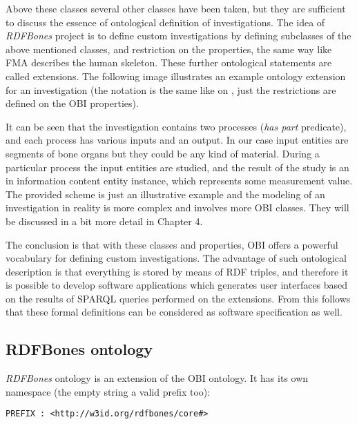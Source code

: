 Above these classes several other classes have been taken, but they are sufficient to discuss the essence of ontological definition of investigations. The idea of \textit{RDFBones} project is to define custom investigations by defining subclasses of the above mentioned classes, and restriction on the properties, the same way like FMA describes the human skeleton. These further ontological statements are called extensions. The following image illustrates an example ontology extension for an investigation (the notation is the same like on , just the restrictions are defined on the OBI properties). 


It can be seen that the investigation contains two processes (\textit{has part} predicate), and each process has various inputs and an output. In our case input entities are segments of bone organs but they could be any kind of material. During a particular process the input entities are studied, and the result of the study is an in information content entity instance, which represents some measurement value. The provided scheme is just an illustrative example and the modeling of an investigation in reality is more complex and involves more OBI classes. They will be discussed in a bit more detail in Chapter 4.

The conclusion is that with these classes and properties, OBI offers a powerful vocabulary for defining custom investigations. The advantage of such ontological description is that everything is stored by means of RDF triples, and therefore it is possible to develop software applications which generates user interfaces based on the results of SPARQL queries performed on the extensions. From this follows that these formal definitions can be considered as software specification as well.

\subsection{RDFBones ontology} \label{rdfbones}

\textit{RDFBones} ontology is an extension of the OBI ontology. It has its own namespace (the empty string a valid prefix too): 

\begin{lstlisting}[basicstyle=\footnotesize, captionpos=b, caption=RDFBones namespace, label=lst:sparql, belowskip=1em, aboveskip=2em,
frame=single]
PREFIX : <http://w3id.org/rdfbones/core#>
\end{lstlisting}

